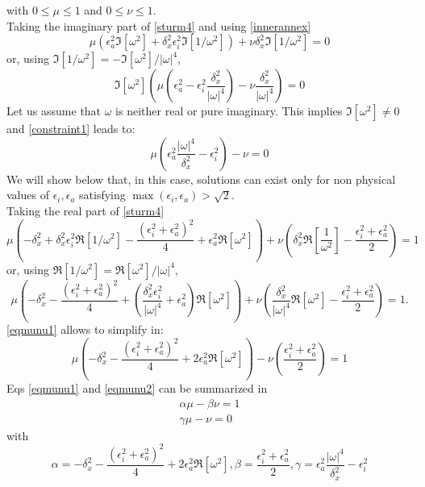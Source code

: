 with $0\le \mu \le 1$ and $0\le \nu \le 1$.\\
Taking the imaginary part of \ref{sturm4} and using \ref{innerannex}
\[
\mu \left( \epsilon_a^2 \Im[\omega^2] +\delta_x^2 \epsilon_i^2 \Im[1/\omega^2]\right)+\nu \delta_x^2\Im[1/\omega^2]=0
\]
or, using $\Im[1/\omega^2]=-\Im[\omega^2]/|\omega|^4$,
\begin{equation}
\Im[\omega^2]\left(\mu \left(\epsilon_a^2 -\epsilon_i^2 \frac{\delta_x^2}{|\omega|^4} \right) -\nu \frac{\delta_x^2}{|\omega|^4} \right)=0
\label{constraint1}
\end{equation}
Let us assume that $\omega$ is neither real or pure imaginary. This implies $\Im[\omega^2] \ne 0$ and \ref{constraint1} leads to:
\begin{equation}
\mu\left(\epsilon_a^2\frac{|\omega|^4}{\delta_x^2} -\epsilon_i^2\right)-\nu=0
\label{eqmunu1}
\end{equation}
We will show below that, in this case, solutions can exist only for non physical values of $\epsilon_i, \epsilon_a$ satisfying $\max(\epsilon_i,\epsilon_a) > \sqrt{2}$.\\
Taking the real part of \ref{sturm4}
\[
\mu \left(-\delta_x^2+\delta_x^2\epsilon_i^2\Re[1/\omega^2]-\frac{(\epsilon_i^2+\epsilon_a^2)^2}{4}+\epsilon_a^2 \Re[\omega^2]\right)
+\nu \left(
\delta_x^2 \Re[\frac{1}{\omega^2}]-\frac{\epsilon_i^2+\epsilon_a^2}{2}
\right)=1
\]
or, using $\Re[1/\omega^2]=\Re[\omega^2]/|\omega|^4$,
\[
\mu \left(-\delta_x^2-\frac{(\epsilon_i^2+\epsilon_a^2)^2}{4}+(\frac{\delta_x^2\epsilon_i^2}{|\omega|^4}+\epsilon_a^2 )\Re[\omega^2]\right)
+\nu \left(
\frac{\delta_x^2}{|\omega|^4} \Re[\omega^2]-\frac{\epsilon_i^2+\epsilon_a^2}{2}
\right)=1.
\]
\ref{eqmunu1} allows to simplify in:
\begin{equation}
\mu \left(-\delta_x^2-\frac{(\epsilon_i^2+\epsilon_a^2)^2}{4}+2\epsilon_a^2\Re[\omega^2] \right)
-\nu \left(
\frac{\epsilon_i^2+\epsilon_a^2}{2}
\right)=1
\label{eqmunu2}
\end{equation}
Eqs \ref{eqmunu1} and \ref{eqmunu2} can be summarized in 
\begin{equation}
\begin{array}{l}
\alpha \mu  - \beta \nu = 1\\
\gamma \mu - \nu=0
\end{array}
\label{eqmunu}
\end{equation}
with
\[
\alpha= -\delta_x^2-\frac{(\epsilon_i^2+\epsilon_a^2)^2}{4}+2\epsilon_a^2\Re[\omega^2], \beta = \frac{\epsilon_i^2+\epsilon_a^2}{2}, \gamma =  \epsilon_a^2\frac{|\omega|^4}{\delta_x^2} -\epsilon_i^2
\]
